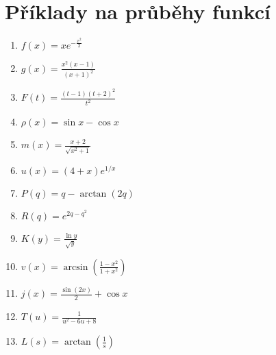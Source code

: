 \section{Příklady na průběhy funkcí}

\begin{enumerate}
    \item $f(x) = x e^{-\frac{x^2}{2}}$
    \item $g(x) = \frac{x^2(x-1)}{(x+1)^2}$
    \item $F(t) = \frac{(t-1)(t+2)^2}{t^2}$
    \item $\rho(x) = \sin x - \cos x$
    \item $m(x) = \frac{x+2}{\sqrt{x^2+1}}$
    \item $u(x) = (4+x)e^{1/x}$
    \item $P(q) = q - \arctan (2q)$
    \item $R(q) = e^{2q-q^2}$
    \item $K(y) = \frac{\ln y}{\sqrt{y}}$
    \item $v(x) = \arcsin \left( \frac{1-x^2}{1+x^2}\right)$
    \item $j(x) = \frac{\sin (2x)}{2} + \cos x$
    \item $T(u) = \frac{1}{u^2-6u+8}$
    \item $L(s) = \arctan \left( \frac{1}{s} \right)$
\end{enumerate}